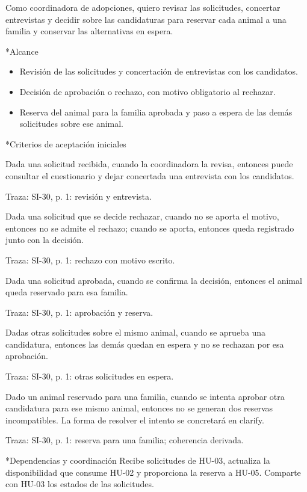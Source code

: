 \documentclass[10pt,a4paper]{article}
\makeatletter
\newcommand{\apartado}{\@startsection{subsection}{2}{\z@}{7pt}{3pt}{\normalfont\normalsize\bfseries\color{verde}}*}
\newenvironment{criterios}{\begin{description}[style=nextline,leftmargin=0pt,labelsep=0pt,font=\bfseries\color{verde},itemsep=5pt,topsep=3pt,parsep=0pt]}{\end{description}}
\newcommand{\historia}[1]{\begingroup\setlength{\fboxsep}{10pt}\colorbox{suave}{\parbox{\dimexpr\linewidth-20pt\relax}{#1}}\endgroup}
\newcommand{\traza}[1]{{\footnotesize\color{gris}Traza: SI-30, #1.}}
\newcommand{\HU}[1]{\mbox{HU-#1}}
\makeatother
\begin{document}
\historia{Como coordinadora de adopciones, quiero revisar las solicitudes, concertar entrevistas y decidir sobre las candidaturas para reservar cada animal a una familia y conservar las alternativas en espera.}
\apartado{Alcance}
\begin{itemize}
\item Revisión de las solicitudes y concertación de entrevistas con los candidatos.
\item Decisión de aprobación o rechazo, con motivo obligatorio al rechazar.
\item Reserva del animal para la familia aprobada y paso a espera de las demás solicitudes sobre ese animal.
\end{itemize}
\apartado{Criterios de aceptación iniciales}
\begin{criterios}
\item[CA-04-01] Dada una solicitud recibida, cuando la coordinadora la revisa, entonces puede consultar el cuestionario y dejar concertada una entrevista con los candidatos.\par\traza{p. 1: revisión y entrevista}
\item[CA-04-02] Dada una solicitud que se decide rechazar, cuando no se aporta el motivo, entonces no se admite el rechazo; cuando se aporta, entonces queda registrado junto con la decisión.\par\traza{p. 1: rechazo con motivo escrito}
\item[CA-04-03] Dada una solicitud aprobada, cuando se confirma la decisión, entonces el animal queda reservado para esa familia.\par\traza{p. 1: aprobación y reserva}
\item[CA-04-04] Dadas otras solicitudes sobre el mismo animal, cuando se aprueba una candidatura, entonces las demás quedan en espera y no se rechazan por esa aprobación.\par\traza{p. 1: otras solicitudes en espera}
\item[CA-04-05] Dado un animal reservado para una familia, cuando se intenta aprobar otra candidatura para ese mismo animal, entonces no se generan dos reservas incompatibles. La forma de resolver el intento se concretará en clarify.\par\traza{p. 1: reserva para una familia; coherencia derivada}
\end{criterios}
\apartado{Dependencias y coordinación}
Recibe solicitudes de \HU{03}, actualiza la disponibilidad que consume \HU{02} y proporciona la reserva a \HU{05}. Comparte con \HU{03} los estados de las solicitudes.
\end{document}
